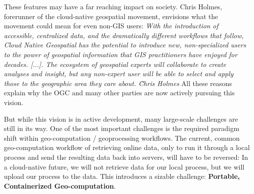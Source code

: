 These features may have a far reaching impact on society. Chris Holmes, forerunner of the cloud-native geospatial movement, envisions what the movement could mean for even non-GIS users: 
\emph{
  With the introduction of accessible, centralized data, and the dramatically different workflows that follow, Cloud Native Geospatial has the potential to introduce new, non-specialized users to the power of geospatial information that GIS practitioners have enjoyed for decades. [...]. The ecosystem of geospatial experts will collaborate to create analyses and insight, but any non-expert user will be able to select and apply those to the geographic area they care about. \~ Chris Holmes
}
All these reasons explain why the OGC and many other parties are now actively pursuing this vision.

But while this vision is in active development, many large-scale challenges are still in its way. 
One of the most important challenges is the required paradigm shift within geo-computation / geoprocessing workflows. 
The current, common geo-computation workflow of retrieving online data, only to run it through a local process and send the resulting data back into servers, will have to be reversed: In a cloud-native future, we will not retrieve data for our local process, but we will upload our process to the data.  
This introduces a sizable challenge: \textbf{Portable, Containerized Geo-computation}.



